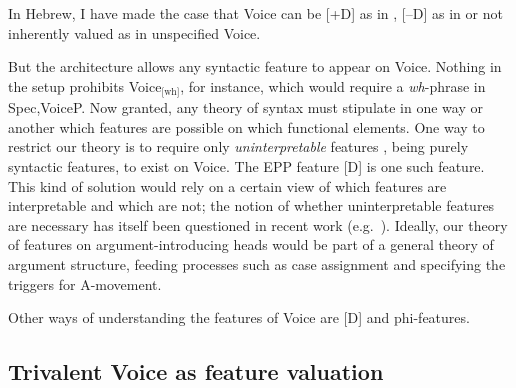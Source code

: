 In Hebrew, I have made the case that Voice can be [+D] as in {\vd}, [--D] as in {\vz} or not inherently valued as in unspecified Voice.

But the architecture allows any syntactic feature to appear on Voice. Nothing in the setup prohibits Voice$_{\text{[wh]}}$, for instance, which would require a \emph{wh}-phrase in Spec,VoiceP. Now granted, any theory of syntax must stipulate in one way or another which features are possible on which functional elements. One way to restrict our theory is to require only \emph{uninterpretable} features \citep{chomsky95}, being purely syntactic features, to exist on Voice. The EPP feature [D] is one such feature. This kind of solution would rely on a certain view of which features are interpretable and which are not; the notion of whether uninterpretable features are necessary has itself been questioned in recent work (e.g.~\citealt{preminger14mit}). Ideally, our theory of features on argument-introducing heads would be part of a general theory of argument structure, feeding processes such as case assignment and specifying the triggers for A-movement.

Other ways of understanding the features of Voice are [D] and phi-features.

	\subsection{Trivalent Voice as feature valuation} \label{i:agree:nie}




